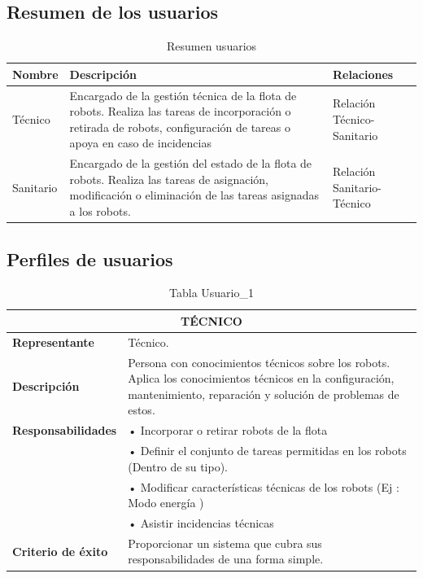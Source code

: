 \documentclass{scrreprt}
\begin{document}
\begin{table}[H]
\subsection{Resumen de los usuarios}
\vspace{0.3cm}
\label{tab:my-table-user}

\begin{tabular}{ |p{2cm}|p{10cm}|p{3cm}|  }
\hline
 \textbf{Nombre} & \textbf{Descripción} & \textbf{Relaciones}\\
\hline
Técnico                        & Encargado de la gestión técnica de la flota de robots. Realiza las tareas de incorporación o retirada de robots, configuración de tareas o apoya en caso de incidencias & Relación Técnico-Sanitario \\ 
\hline
Sanitario                          & Encargado de la gestión del estado de la flota de robots. Realiza las tareas de asignación, modificación o eliminación de las tareas asignadas a los robots. & Relación Sanitario-Técnico  \\ 
\hline
\end{tabular}%

\caption{Resumen usuarios}
\end{table}

\subsection{Perfiles de usuarios}
\vspace{0.3cm}
\begin{table}[H]
\label{tab:my-table-user}
\begin{tabular}{|p{4cm}|p{11cm}|}
\hline
\multicolumn{2}{|c|}{\textbf{TÉCNICO}} \\ \hline
\textbf{Representante}                         & Técnico.  \\ \hline
\textbf{Descripción} &  Persona con conocimientos técnicos sobre los robots. Aplica los conocimientos técnicos en la configuración, mantenimiento, reparación y solución de problemas de estos. \\ \hline
\textbf{Responsabilidades}                         &  • Incorporar o retirar robots de la flota \\
 &  •	Definir el conjunto de tareas permitidas en los robots (Dentro de su tipo). \\
 & •	Modificar características técnicas de los robots (Ej : Modo energía )  \\ 
 & •	Asistir incidencias técnicas \\
 \hline
\textbf{Criterio de éxito}                         & Proporcionar un sistema que cubra sus responsabilidades de una forma simple.  \\ \hline
\end{tabular}%

\caption{Tabla Usuario_1}
\end{table}
\end{document}
